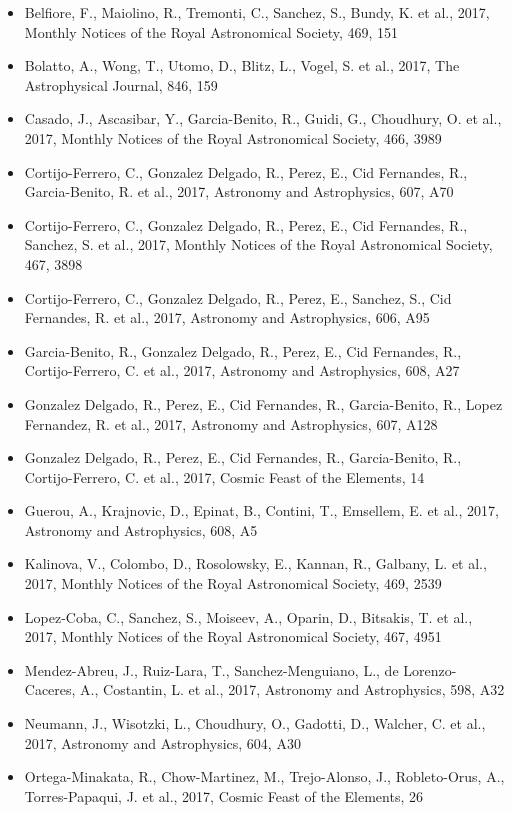 \documentclass{letter}
\begin{document}
\begin{enumerate}
\begin{itemize}
\item Belfiore, F., Maiolino, R., Tremonti, C., Sanchez, S., Bundy, K. et al., 2017, Monthly Notices of the Royal Astronomical Society, 469, 151
\item Bolatto, A., Wong, T., Utomo, D., Blitz, L., Vogel, S. et al., 2017, The Astrophysical Journal, 846, 159
\item Casado, J., Ascasibar, Y., Garcia-Benito, R., Guidi, G., Choudhury, O. et al., 2017, Monthly Notices of the Royal Astronomical Society, 466, 3989
\item Cortijo-Ferrero, C., Gonzalez Delgado, R., Perez, E., Cid Fernandes, R., Garcia-Benito, R. et al., 2017, Astronomy and Astrophysics, 607, A70
\item Cortijo-Ferrero, C., Gonzalez Delgado, R., Perez, E., Cid Fernandes, R., Sanchez, S. et al., 2017, Monthly Notices of the Royal Astronomical Society, 467, 3898
\item Cortijo-Ferrero, C., Gonzalez Delgado, R., Perez, E., Sanchez, S., Cid Fernandes, R. et al., 2017, Astronomy and Astrophysics, 606, A95
\item Garcia-Benito, R., Gonzalez Delgado, R., Perez, E., Cid Fernandes, R., Cortijo-Ferrero, C. et al., 2017, Astronomy and Astrophysics, 608, A27
\item Gonzalez Delgado, R., Perez, E., Cid Fernandes, R., Garcia-Benito, R., Lopez Fernandez, R. et al., 2017, Astronomy and Astrophysics, 607, A128
\item Gonzalez Delgado, R., Perez, E., Cid Fernandes, R., Garcia-Benito, R., Cortijo-Ferrero, C. et al., 2017, Cosmic Feast of the Elements, 14
\item Guerou, A., Krajnovic, D., Epinat, B., Contini, T., Emsellem, E. et al., 2017, Astronomy and Astrophysics, 608, A5
\item Kalinova, V., Colombo, D., Rosolowsky, E., Kannan, R., Galbany, L. et al., 2017, Monthly Notices of the Royal Astronomical Society, 469, 2539
\item Lopez-Coba, C., Sanchez, S., Moiseev, A., Oparin, D., Bitsakis, T. et al., 2017, Monthly Notices of the Royal Astronomical Society, 467, 4951
\item Mendez-Abreu, J., Ruiz-Lara, T., Sanchez-Menguiano, L., de Lorenzo-Caceres, A., Costantin, L. et al., 2017, Astronomy and Astrophysics, 598, A32
\item Neumann, J., Wisotzki, L., Choudhury, O., Gadotti, D., Walcher, C. et al., 2017, Astronomy and Astrophysics, 604, A30
\item Ortega-Minakata, R., Chow-Martinez, M., Trejo-Alonso, J., Robleto-Orus, A., Torres-Papaqui, J. et al., 2017, Cosmic Feast of the Elements, 26

\end{itemize}
\end{enumerate}
\end{document}
